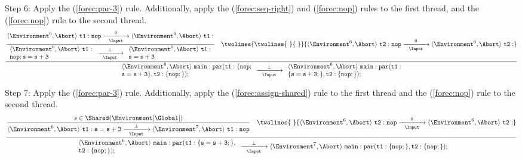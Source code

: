 \noindent
Step 6: Apply the (\ref{forec:par-3}) rule. Additionally, apply the (\ref{forec:seq-right}) 
and (\ref{forec:nop}) rules to the first thread, and the (\ref{forec:nop}) rule to the second
thread.
\begin{equation*}
	\frac{
		\dfrac{
				\langle \Environment^6, \Abort \rangle ~ \mathtt{t1: nop}
					\xrightarrow[~~\Input~~]{0} 
				\langle \Environment^6, \Abort \rangle ~ \mathtt{t1: }
			}{
				\begin{array}{l}
					\langle \Environment^6, \Abort \rangle ~ \mathtt{t1: }	\\
					\mathtt{nop; s=s+3}										\\
				\end{array}
					\xrightarrow[~~\Input~~]{\bot} 
				\begin{array}{l}
					\langle \Environment^6, \Abort \rangle ~ \mathtt{t1: }	\\
					\mathtt{s=s+3}											\\
				\end{array}
			}
			\quad
			\twolines{
				\twolines{
						~
					}{
						~
					}
				}{
					\langle \Environment^6, \Abort \rangle ~ \mathtt{t2: nop}
						\xrightarrow[~~\Input~~]{0} 
					\langle \Environment^6, \Abort \rangle ~ \mathtt{t2: }
				}
		}{
			\begin{array}{l}
				\langle \Environment^6, \Abort \rangle ~ \mathtt{main: par( t1:\{nop;}	\\
				\mathtt{s=s+3\}, t2:\{nop;\} );}										\\
			\end{array}
				\xrightarrow[~~\Input~~]{\bot} 
			\begin{array}{l}
				\langle \Environment^6, \Abort \rangle ~ \mathtt{main: par( t1: }		\\
				\mathtt{\{s=s+3;\}, t2:\{nop;\} );}										\\
			\end{array}
		}
\end{equation*}

\noindent
Step 7: Apply the (\ref{forec:par-3}) rule. Additionally, apply the (\ref{forec:assign-shared}) 
rule to the first thread and the (\ref{forec:nop}) rule to the second
thread.
\begin{equation*}
	\frac{
		\dfrac{
				s \in \Shared(\Environment[\Global])
			}{
				\langle \Environment^6, \Abort \rangle ~ \mathtt{t1: s=s+3}
					\xrightarrow[~~\Input~~]{\bot} 
				\langle \Environment^7, \Abort \rangle ~ \mathtt{t1: nop}
			}
			\quad
			\twolines{
					~
				}{
					\langle \Environment^6, \Abort \rangle ~ \mathtt{t2: nop}
						\xrightarrow[~~\Input~~]{0} 
					\langle \Environment^6, \Abort \rangle ~ \mathtt{t2: }
				}
		}{
			\begin{array}{l}
				\langle \Environment^6, \Abort \rangle ~ \mathtt{main: par( t1: \{s=s+3;\},}	\\
				\mathtt{ t2:\{nop;\} );}														\\
			\end{array}
				\xrightarrow[~~\Input~~]{\bot} 
			\langle \Environment^7, \Abort \rangle ~ \mathtt{main: par( t1: \{nop;\}, t2:\{nop;\} );}
		}
\end{equation*}

